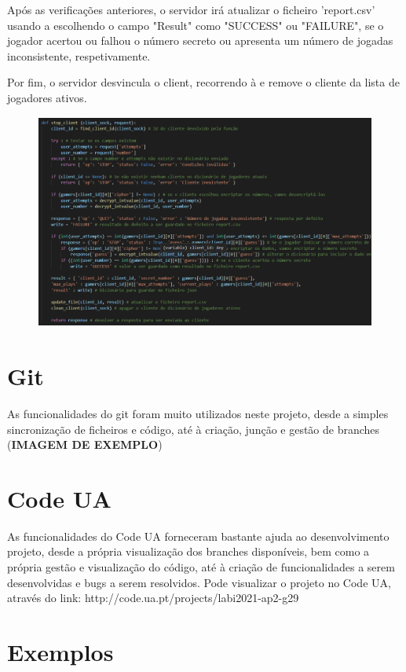 \documentclass{report}
\begin{document}
Após as verificações anteriores, o servidor irá atualizar o ficheiro 'report.csv' usando a  escolhendo o campo "Result" como "SUCCESS" ou "FAILURE", se o jogador acertou ou falhou o número secreto ou apresenta um número de jogadas inconsistente, respetivamente.

Por fim, o servidor desvincula o client, recorrendo à  e remove o cliente da lista de jogadores ativos.

\begin{figure}[!h]
\center
\includegraphics[height = 200pt]{img/stopclient.png}
\end{figure}

\section{Git}
\label{sec:git}
As funcionalidades do git foram muito utilizados neste projeto, desde a simples sincronização de ficheiros e código, até à criação, junção e gestão de branches (\textbf{IMAGEM DE EXEMPLO})

\section{Code UA}
\label{sec:git}
As funcionalidades do Code UA forneceram bastante ajuda ao desenvolvimento projeto, desde a própria visualização dos branches disponíveis, bem como a própria gestão e visualização do código, até à criação de funcionalidades a serem desenvolvidas e bugs a serem resolvidos. Pode visualizar o projeto no Code UA, através do link: http://code.ua.pt/projects/labi2021-ap2-g29


\section{Exemplos}
\end{document}
